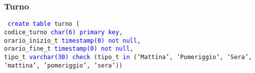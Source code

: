 \documentclass{article}
\begin{document}
    \subsubsection{Turno}
    \begin{flushleft}
        \texttt{
        \textcolor{blue}{create table} turno ( \\
        \hspace*{2em} codice\_turno \hspace*{2.7em} \textcolor{blue}{char(6)} \hspace*{6em} \textcolor{blue}{primary key}, \\
        \hspace*{2em} orario\_inizio\_t \hspace*{1.2em} \textcolor{blue}{timestamp(0)} \hspace*{3.7em} \textcolor{blue}{not null}, \\
        \hspace*{2em} orario\_fine\_t \hspace*{2.2em} \textcolor{blue}{timestamp(0)} \hspace*{3.7em} \textcolor{blue}{not null}, \\
        \hspace*{2em} tipo\_t \hspace*{5.6em} \textcolor{blue}{varchar(30)} \hspace*{4.1em} \textcolor{blue}{check} (tipo\_t \textcolor{blue}{in} ('Mattina', \hspace*{2.2em}'Pomeriggio', 'Sera', 'mattina', 'pomeriggio', 'sera'))\\}
    \end{flushleft}
\end{document}
